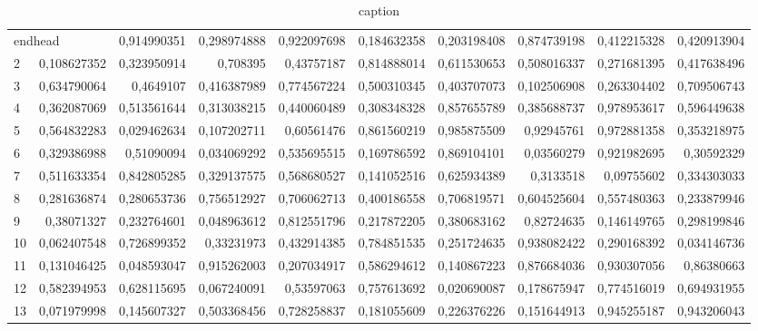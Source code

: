 \documentclass{article}
\begin{document}
 
\blindtext
 
\begin{landscape}
\begin{longtable}{lrrrrrrrrr}
\caption{caption} \\
\multicolumn{2}{l}{endhead}\endhead
\multicolumn{10}{c}{endfoot} \endfoot
\multicolumn{2}{l}{endfirsthead} \endfirsthead
\multicolumn{10}{c}{endlastfoot}\endlastfoot
1	&	0,914990351	&	0,298974888	&	0,922097698	&	0,184632358	&	0,203198408	&	0,874739198	&	0,412215328	&	0,420913904	&	0,740320564	\\
2	&	0,108627352	&	0,323950914	&	0,708395	&	0,43757187	&	0,814888014	&	0,611530653	&	0,508016337	&	0,271681395	&	0,417638496	\\
3	&	0,634790064	&	0,4649107	&	0,416387989	&	0,774567224	&	0,500310345	&	0,403707073	&	0,102506908	&	0,263304402	&	0,709506743	\\
4	&	0,362087069	&	0,513561644	&	0,313038215	&	0,440060489	&	0,308348328	&	0,857655789	&	0,385688737	&	0,978953617	&	0,596449638	\\
5	&	0,564832283	&	0,029462634	&	0,107202711	&	0,60561476	&	0,861560219	&	0,985875509	&	0,92945761	&	0,972881358	&	0,353218975	\\
6	&	0,329386988	&	0,51090094	&	0,034069292	&	0,535695515	&	0,169786592	&	0,869104101	&	0,03560279	&	0,921982695	&	0,30592329	\\
7	&	0,511633354	&	0,842805285	&	0,329137575	&	0,568680527	&	0,141052516	&	0,625934389	&	0,3133518	&	0,09755602	&	0,334303033	\\
8	&	0,281636874	&	0,280653736	&	0,756512927	&	0,706062713	&	0,400186558	&	0,706819571	&	0,604525604	&	0,557480363	&	0,233879946	\\
9	&	0,38071327	&	0,232764601	&	0,048963612	&	0,812551796	&	0,217872205	&	0,380683162	&	0,82724635	&	0,146149765	&	0,298199846	\\
10	&	0,062407548	&	0,726899352	&	0,33231973	&	0,432914385	&	0,784851535	&	0,251724635	&	0,938082422	&	0,290168392	&	0,034146736	\\
11	&	0,131046425	&	0,048593047	&	0,915262003	&	0,207034917	&	0,586294612	&	0,140867223	&	0,876684036	&	0,930307056	&	0,86380663	\\
12	&	0,582394953	&	0,628115695	&	0,067240091	&	0,53597063	&	0,757613692	&	0,020690087	&	0,178675947	&	0,774516019	&	0,694931955	\\
13	&	0,071979998	&	0,145607327	&	0,503368456	&	0,728258837	&	0,181055609	&	0,226376226	&	0,151644913	&	0,945255187	&	0,943206043	\\

\end{longtable}
\end{landscape}
\end{document}
